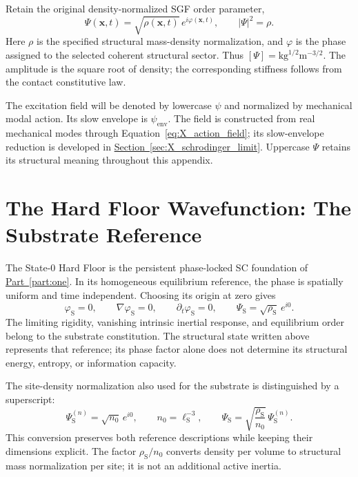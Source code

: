 Retain the original density-normalized SGF order parameter,
\begin{equation}
    \boxed{
    \Psi(\mathbf x,t)=\sqrt{\rho(\mathbf x,t)}\,e^{i\varphi(\mathbf x,t)},
    \qquad |\Psi|^2=\rho
    }.
    \label{eq:X_structural_order_parameter}
\end{equation}
Here $\rho$ is the specified structural mass-density normalization, and $\varphi$ is the phase assigned to the selected coherent structural sector. Thus $[\Psi]=\mathrm{kg}^{1/2}\mathrm m^{-3/2}$. The amplitude is the square root of density; the corresponding stiffness follows from the contact constitutive law.

The excitation field will be denoted by lowercase $\psi$ and normalized by mechanical modal action. Its slow envelope is $\psi_{\mathrm{env}}$. The field is constructed from real mechanical modes through Equation~\eqref{eq:X_action_field}; its slow-envelope reduction is developed in \hyperref[sec:X_schrodinger_limit]{Section~\ref*{sec:X_schrodinger_limit}}. Uppercase $\Psi$ retains its structural meaning throughout this appendix.

\section{The Hard Floor Wavefunction: The Substrate Reference}

The State-0 Hard Floor is the persistent phase-locked SC foundation of \hyperref[part:one]{Part~\ref*{part:one}}. In its homogeneous equilibrium reference, the phase is spatially uniform and time independent. Choosing its origin at zero gives
\begin{equation}
    \varphi_{\mathrm S}=0,
    \qquad
    \nabla\varphi_{\mathrm S}=0,
    \qquad
    \partial_t\varphi_{\mathrm S}=0,
    \qquad
    \boxed{\Psi_{\mathrm S}=\sqrt{\rho_{\mathrm S}}\,e^{i0}}.
\end{equation}
The limiting rigidity, vanishing intrinsic inertial response, and equilibrium order belong to the substrate constitution. The structural state written above represents that reference; its phase factor alone does not determine its structural energy, entropy, or information capacity.

The site-density normalization also used for the substrate is distinguished by a superscript:
\begin{equation}
    \Psi_{\mathrm S}^{(n)}=\sqrt{n_0}\,e^{i0},
    \qquad n_0=\ell_{\mathrm S}^{-3},
    \qquad
    \Psi_{\mathrm S}=\sqrt{\frac{\rho_{\mathrm S}}{n_0}}\,
    \Psi_{\mathrm S}^{(n)}.
\end{equation}
This conversion preserves both reference descriptions while keeping their dimensions explicit. The factor $\rho_{\mathrm S}/n_0$ converts density per volume to structural mass normalization per site; it is not an additional active inertia.

